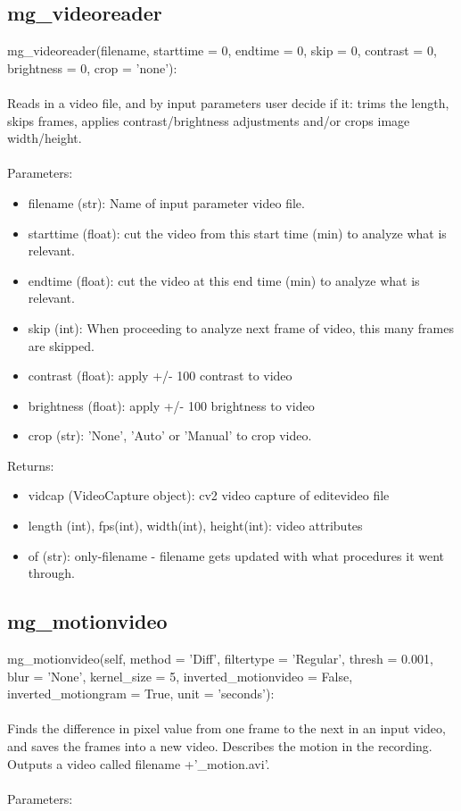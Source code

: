\documentclass[9pt]{extarticle}
\begin{document}
\subsection{mg\_videoreader}
    mg\_videoreader(filename, starttime = 0, endtime = 0, skip = 0, contrast = 0, brightness = 0, crop = 'none'):
    \\\\
    Reads in a video file, and by input parameters user decide if it: trims the length, skips frames, applies contrast/brightness adjustments and/or crops image width/height.
    \\\\
    Parameters:
    \begin{itemize}
     \item [] filename (str): Name of input parameter video file.
     \item [] starttime (float): cut the video from this start time (min) to analyze what is relevant.
     \item [] endtime (float): cut the video at this end time (min) to analyze what is relevant.
     \item [] skip (int): When proceeding to analyze next frame of video, this many frames are skipped.
     \item [] contrast (float): apply +/- 100 contrast to video
     \item [] brightness (float): apply +/- 100 brightness to video
     \item [] crop (str): 'None', 'Auto' or 'Manual' to crop video.
    \end{itemize}
    Returns:
    \begin{itemize}
    \item [] vidcap (VideoCapture object): cv2 video capture of editevideo file
    \item [] length (int), fps(int), width(int), height(int): video attributes
     \item [] of (str): only-filename - filename gets updated with what procedures it went through.
 \end{itemize}

\subsection{mg\_motionvideo}    
    mg\_motionvideo(self, method = 'Diff', filtertype = 'Regular', thresh = 0.001, blur = 'None', kernel\_size = 5, inverted\_motionvideo = False, inverted\_motiongram = True, unit = 'seconds'):
    \\\\
    Finds the difference in pixel value from one frame to the next in an input video, and saves the frames into a new video.
    Describes the motion in the recording.    
    Outputs a video called filename +'\_motion.avi'.
    \\\\
    Parameters:
    
\end{document}
